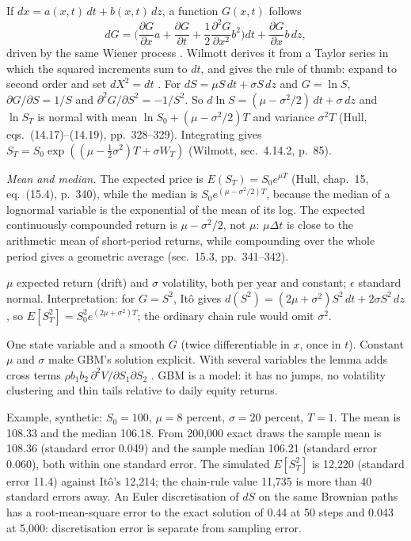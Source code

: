 \begin{qfresult}\label{res:ito-lemma-geometric-brownian-motion}
 If $dx=a(x,t)\,dt+b(x,t)\,dz$, a function $G(x,t)$ follows
\[ dG=\Big(\frac{\partial G}{\partial x}a+\frac{\partial G}{\partial t}+\frac12\frac{\partial^2G}{\partial x^2}b^2\Big)dt+\frac{\partial G}{\partial x}b\,dz, \]
driven by the same Wiener process \citep[chap.~14, sec.~14.6, eq.~(14.12), p.~327]{s7-hulloptions}. Wilmott derives it from a Taylor series in which the squared increments sum to $dt$, and gives the rule of thumb: expand to second order and set $dX^2=dt$ \citep[chap.~4, secs.~4.10 and~4.12, pp.~78--83]{wide-wilmott-pwoqf}. For $dS=\mu S\,dt+\sigma S\,dz$ and $G=\ln S$, $\partial G/\partial S=1/S$ and $\partial^2G/\partial S^2=-1/S^2$. So $d\ln S=(\mu-\sigma^2/2)\,dt+\sigma\,dz$ and $\ln S_T$ is normal with mean $\ln S_0+(\mu-\sigma^2/2)T$ and variance $\sigma^2T$ (Hull, eqs.~(14.17)--(14.19), pp.~328--329). Integrating gives $S_T=S_0\exp((\mu-\tfrac12\sigma^2)T+\sigma W_T)$ (Wilmott, sec.~4.14.2, p.~85).

\emph{Mean and median.} The expected price is $E(S_T)=S_0e^{\mu T}$ (Hull, chap.~15, eq.~(15.4), p.~340), while the median is $S_0e^{(\mu-\sigma^2/2)T}$, because the median of a lognormal variable is the exponential of the mean of its log. The expected continuously compounded return is $\mu-\sigma^2/2$, not $\mu$: $\mu\Delta t$ is close to the arithmetic mean of short-period returns, while compounding over the whole period gives a geometric average (sec.~15.3, pp.~341--342).

 $\mu$ expected return (drift) and $\sigma$ volatility, both per year and constant; $\epsilon$ standard normal. Interpretation: for $G=S^2$, It\^o gives $d(S^2)=(2\mu+\sigma^2)S^2\,dt+2\sigma S^2\,dz$, so $E[S_T^2]=S_0^2e^{(2\mu+\sigma^2)T}$; the ordinary chain rule would omit $\sigma^2$.

 One state variable and a smooth $G$ (twice differentiable in $x$, once in $t$). Constant $\mu$ and $\sigma$ make GBM's solution explicit. With several variables the lemma adds cross terms $\rho b_1b_2\,\partial^2V/\partial S_1\partial S_2$ \citep[sec.~4.13, eq.~(4.9), p.~84]{wide-wilmott-pwoqf}. GBM is a model: it has no jumps, no volatility clustering and thin tails relative to daily equity returns.

 Example, synthetic: $S_0=100$, $\mu=8$ percent, $\sigma=20$ percent, $T=1$. The mean is 108.33 and the median 106.18. From 200{,}000 exact draws the sample mean is 108.36 (standard error 0.049) and the sample median 106.21 (standard error 0.060), both within one standard error. The simulated $E[S_T^2]$ is 12{,}220 (standard error 11.4) against It\^o's 12{,}214; the chain-rule value 11{,}735 is more than 40 standard errors away. An Euler discretisation of $dS$ on the same Brownian paths has a root-mean-square error to the exact solution of 0.44 at 50 steps and 0.043 at 5{,}000: discretisation error is separate from sampling error.


\end{qfresult}
